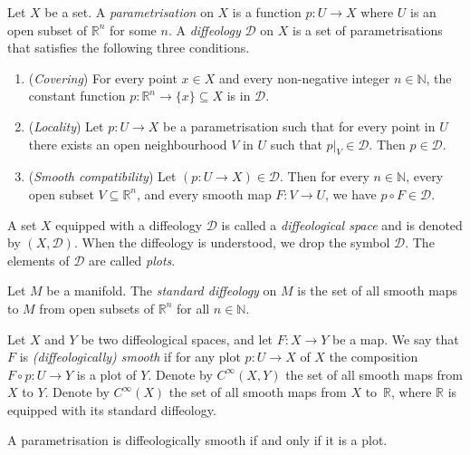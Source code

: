 \documentclass[11pt]{article}
\numberwithin{equation}{section}
\newcommand{\NN}{{\mathbb{N}}} %
\newcommand{\RR}{{\mathbb{R}}} %
\newcommand{\CIN}{{C^\infty}} %
\def \calD {{\mathcal{D}}}
\begin{document}
\begin{Definition}
Let $X$ be a set. A \emph{parametrisation} on $X$ is a
function $p \colon U \to X$ where $U$ is an open subset of $\RR^n$
for some $n$.
A \emph{diffeology} $\mathcal{D}$ on $X$ is a set of parametrisations
that satisf\/ies the following three conditions.

\begin{enumerate}\itemsep=0pt
\item (\emph{Covering})
For every point $x \in X$ and every non-negative integer $n \in \NN$,
the constant function $p \colon \RR^n \to \{ x \} \subseteq X$
is in $\mathcal{D}$.
\item (\emph{Locality})
Let $p \colon U \to X$ be a parametrisation such that
for every point in $U$ there exists an open neighbourhood $V$ in $U$
such that $p|_V \in \mathcal{D}$. Then $p\in\mathcal{D}$.
\item (\emph{Smooth compatibility})
Let $(p \colon U\to X) \in \mathcal{D}$.
Then for every $n \in \NN$, every open subset $V \subseteq \RR^n$,
and every smooth map $F \colon V \to U$, we have $p \circ F \in \mathcal{D}$.
\end{enumerate}

A set $X$ equipped with a dif\/feology $\mathcal{D}$ is called
a \emph{diffeological space} and is denoted by $(X,\mathcal{D})$.
When the dif\/feology is understood, we drop the symbol $\mathcal{D}$.
The elements of $\calD$ are called \emph{plots}.
\end{Definition}

\begin{Example}
Let $M$ be a manifold. The \emph{standard diffeology} on $M$ is the
set of all smooth maps to $M$ from open subsets of $\RR^n$
for all $n \in \NN$.
\end{Example}

\begin{Definition}
Let $X$ and $Y$ be two dif\/feological spaces,
and let $F \colon X\to Y$ be a map. We say that $F$ is
\emph{(diffeologically) smooth} if for any plot $p \colon U \to X$ of $X$
the composition $ F \circ p \colon U \to Y$ is a plot of $Y$.
Denote by $\CIN(X,Y)$ the set of all smooth maps
from $X$ to $Y$.
Denote by $\CIN(X)$ the set of all smooth maps from $X$ to~$\RR$,
where $\RR$ is equipped with its standard dif\/feology.
\end{Definition}

\begin{Remark}[plots]
A parametrisation is dif\/feologically smooth if and only if it is a plot.
\end{Remark}
\end{document}
